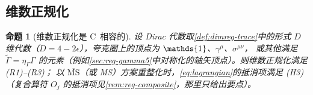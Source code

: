 \documentclass[UTF8,a4paper,11pt,fontset=fandol]{ctexart}
\let\amsmathbb\mathbb
\renewcommand{\mathbb}[1]{\ifx1#1\mathds{1}\else\amsmathbb{#1}\fi}
\theoremstyle{cplain}
\newtheorem{proposition}[theorem]{命题}
\theoremstyle{cdefinition}
\theoremstyle{cremark}
\numberwithin{equation}{section}
\newcommand{\Cconj}[1]{\widetilde{#1}}              %
\begin{document}
\subsection{维数正规化}\label{sec:reg-dimreg}

\begin{proposition}[维数正规化是 C~相容的]\label{prop:reg-dimreg}
设 Dirac 代数取\cref{def:dimreg-trace}中的形式 $D$ 维代数（$D=4-2\epsilon$），夸克圈上的顶点为 $\mathbb 1$、$\gamma^\mu$、$\sigma^{\mu\nu}$，
或其他满足 $\Cconj\Gamma=\eta_\Gamma\Gamma$ 的元素（例如\cref{sec:reg-gamma5}中对称化的轴矢顶点）。则维数正规化\cite{tHooftVeltman1972,BolliniGiambiagi1972}满足 (R1)--(R3)；
以 $\overline{\mathrm{MS}}$（或 MS）方案重整化时，\cref{eq:lagrangian}的抵消项满足 (H3)（复合算符 $O_j$ 的抵消项见\cref{rem:reg-composite}，那里只给出要点）。
\end{proposition}
\end{document}
